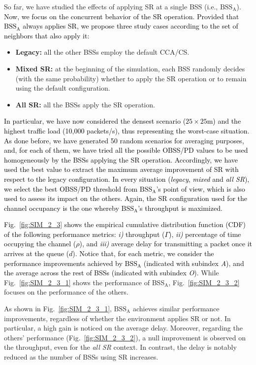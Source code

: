 \documentclass[preprint,12pt]{elsarticle}
\begin{document}
So far, we have studied the effects of applying SR at a single BSS (i.e., $\text{BSS}_\text{A}$). \textcolor{black}{Now, we focus on the concurrent behavior of the SR operation. Provided that $\text{BSS}_\text{A}$ always applies SR, we propose three study cases according to the set of neighbors that also apply it: }
\begin{itemize}
	\item \textbf{Legacy:} all the other BSSs employ the default CCA/CS.
	\item \textbf{Mixed SR:} at the beginning of the simulation, each BSS randomly decides (with the same probability) whether to apply the SR operation or to remain using the default configuration.
	\item \textbf{All SR:} all the BSSs apply the SR operation. 
\end{itemize}

\textcolor{black}{In particular, we have now considered the densest scenario ($25\times25$m) and the highest traffic load (10,000 packets/s), thus representing the worst-case situation. As done before, we have generated 50 random scenarios for averaging purposes, and, for each of them, we have tried all the possible OBSS/PD values to be used homogeneously by the BSSs applying the SR operation. Accordingly, we have used the best value to extract the maximum average improvement of SR with respect to the legacy configuration. In every situation (\emph{legacy}, \emph{mixed} and \emph{all SR}), we select the best OBSS/PD threshold from $\text{BSS}_\text{A}$'s point of view, which is also used to assess its impact on the others. Again, the SR configuration used for the channel occupancy is the one whereby $\text{BSS}_\text{A}$'s throughput is maximized.}

\textcolor{black}{Fig.~\ref{fig:SIM_2_3} shows the empirical cumulative distribution function (CDF) of the following performance metrics: \emph{i)} throughput ($\Gamma$), \emph{ii)} percentage of time occupying the channel ($\rho$), and \emph{iii)} average delay for transmitting a packet once it arrives at the queue ($d$). Notice that, for each metric, we consider the performance improvements achieved by $\text{BSS}_\text{A}$ (indicated with subindex \emph{A}), and the average across the rest of BSSs (indicated with subindex \emph{O}).} While Fig.~\ref{fig:SIM_2_3_1} shows the performance of BSS$_\text{A}$, Fig.~\ref{fig:SIM_2_3_2} focuses on the performance of the others.

As shown in Fig.~\ref{fig:SIM_2_3_1}, $\text{BSS}_\text{A}$ achieves similar performance improvements, regardless of whether the environment applies SR or not. In particular, a high gain is noticed on the average delay. Moreover, regarding the others' performance (Fig.~\ref{fig:SIM_2_3_2}), a null improvement is observed on the throughput, even for the \emph{all SR} context. In contrast, the delay is notably reduced as the number of BSSs using SR increases.
\end{document}

